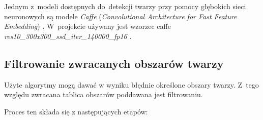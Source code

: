 Jednym z~modeli dostępnych do~detekcji twarzy przy pomocy głębokich sieci neuronowych są modele \textit{Caffe} (\textit{Convolutional Architecture for Fast Feature Embedding}) \cite{jia2014caffe}. W~projekcie używany jest wzorzec caffe \textit{res10{\_}300x300{\_}ssd{\_}iter{\_}140000{\_}fp16} \cite{caffemodel_res10}.


\subsection{Filtrowanie zwracanych obszarów twarzy}
\label{section:face_detection_filter}

Użyte algorytmy mogą dawać w wyniku błędnie określone obszary twarzy. Z~tego względu zwracana tablica obszarów poddawana jest filtrowaniu.

\par

Proces ten składa się z następujących etapów:


